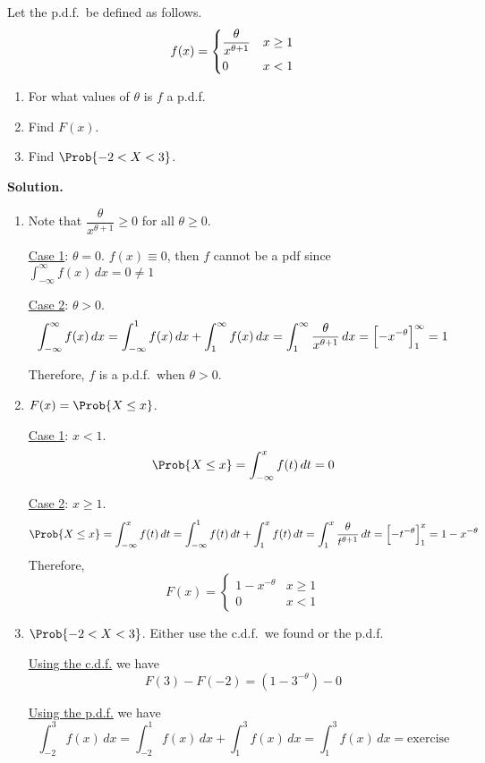 \begin{Example}{}{}
    Let the p.d.f.\ be defined as follows.
    \[ f(x)=\begin{dcases}
            \frac{\theta}{x^{\theta+1}} & x\ge 1 \\
            0                           & x<1
        \end{dcases} \]
    \begin{enumerate}[label=(\roman*)]
        \item For what values of $ \theta $ is $ f $ a p.d.f.
        \item Find $ F(x) $.
        \item Find $ \Prob{-2<X<3} $.
    \end{enumerate}
    \textbf{Solution.}

    \begin{enumerate}[label=(\roman*)]
        \item Note that $ \dfrac{\theta}{x^{\theta+1}} \ge 0 $
              for all $ \theta\ge 0 $.

              \underline{Case 1}: $ \theta=0 $. $ f(x)\equiv 0 $, then $ f $
              cannot be a pdf since $ \int_{-\infty}^{\infty} f(x)\, d{x}=0\neq 1 $

              \underline{Case 2}: $ \theta>0 $.
              \[ \int_{-\infty}^{\infty} f(x)\, d{x}=\int_{-\infty}^{1} f(x)\, d{x}
                  +\int_{1}^{\infty} f(x)\, d{x}=\int_{1}^{\infty} \frac{\theta}{x^{\theta+1}}\, d{x}
                  =\Bigl[ -x^{-\theta} \Bigr]_1^\infty=1 \]

              Therefore, $ f $ is a p.d.f.\ when $ \theta>0 $.

        \item $ F(x)=\Prob{X\le x} $.

              \underline{Case 1}: $ x<1 $.
              \[ \Prob{X\le x}=\int_{-\infty}^{x} f(t)\, d{t} =0 \]

              \underline{Case 2}:  $ x\ge 1 $.
              \[ \Prob{X\le x}=\int_{-\infty}^{x} f(t)\, d{t}
                  =\int_{-\infty}^{1} f(t)\, d{t} +\int_{1}^{x} f(t)\, d{t}
                  =\int_{1}^{x} \frac{\theta}{t^{\theta+1}} \, d{t}=\Bigl[ -t^{-\theta} \Bigr]_1^x=
                  1-x^{-\theta}  \]
              Therefore,
              \[ F(x)=\begin{cases}
                      1-x^{-\theta} & x\ge 1 \\
                      0             & x< 1
                  \end{cases} \]
        \item $ \Prob{-2<X<3} $. Either use the c.d.f.\ we found or the p.d.f.

              \underline{Using the c.d.f.} we have
              \[ F(3)-F(-2)=(1-3^{-\theta})-0 \]

              \underline{Using the p.d.f.} we have
              \[ \int_{-2}^{3} f(x)\, d{x}=
                  \int_{-2}^{1} f(x)\, d{x} +\int_{1}^{3} f(x)\, d{x}
                  =\int_{1}^{3} f(x)\, d{x}=\text{exercise} \]
    \end{enumerate}

\end{Example}
